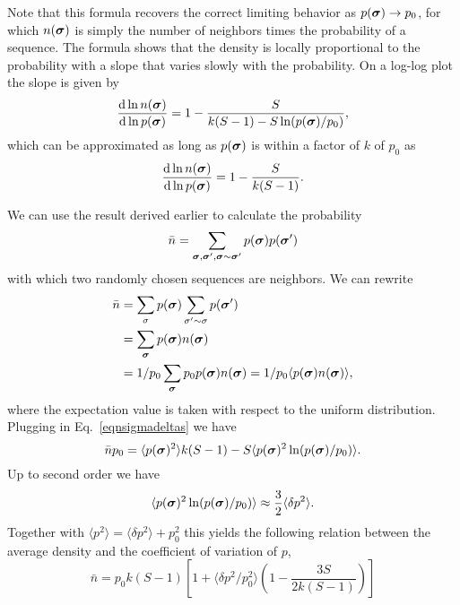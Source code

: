 Note that this formula recovers the correct limiting behavior as $p(\boldsymbol \sigma) \to p_0$, for which $n(\boldsymbol \sigma)$ is simply the number of neighbors times the probability of a sequence. The formula shows that the density is locally proportional to the probability with a slope that varies slowly with the probability. On a log-log plot the slope is given by
\begin{equation}
\frac{\mathrm{d} \ln n(\boldsymbol \sigma)}{\mathrm{d} \ln p(\boldsymbol \sigma)} = 1 - \frac{S}{k(S-1) - S \ln(p(\boldsymbol \sigma)/p_0)},
\end{equation}
which can be approximated as long as $p(\boldsymbol \sigma)$ is within a factor of $k$ of $p_0$ as
\begin{equation}
\frac{\mathrm{d} \ln n(\boldsymbol \sigma)}{\mathrm{d} \ln p(\boldsymbol \sigma)} = 1 - \frac{S}{k(S-1)}.
\end{equation}

We can use the result derived earlier to calculate the probability 
\begin{align}
\bar n = \sum_{\boldsymbol \sigma, \boldsymbol \sigma', \boldsymbol \sigma \sim \boldsymbol \sigma'} p(\boldsymbol \sigma) p(\boldsymbol \sigma') 
\end{align}
with which two randomly chosen sequences are neighbors. We can rewrite
\begin{align*}
\bar n &= \sum_{\sigma} p(\boldsymbol \sigma) \sum_{\sigma' \sim \sigma} p(\boldsymbol \sigma')  \\
    &= \sum_{\boldsymbol \sigma} p(\boldsymbol \sigma) n(\boldsymbol \sigma)\\
    &= 1/p_0 \sum_{\boldsymbol \sigma} p_0 p(\boldsymbol \sigma) n(\boldsymbol \sigma) = 1/p_0 \langle p(\boldsymbol \sigma) n(\boldsymbol \sigma) \rangle,
\end{align*}
where the expectation value is taken with respect to the uniform distribution.
Plugging in Eq.~\ref{eqnsigmadeltas} we have
\begin{equation}
\bar n p_0 = \langle p(\boldsymbol \sigma)^2 \rangle k(S-1) - S \langle p(\boldsymbol \sigma)^2 \ln (p(\boldsymbol \sigma)/p_0) \rangle.
\end{equation}
Up to second order we have
\begin{equation}
\langle p(\boldsymbol \sigma)^2 \ln (p(\boldsymbol \sigma)/p_0) \rangle \approx \frac{3}{2} \langle \delta p^2\rangle.
\end{equation}
Together with $\langle p^2 \rangle = \langle \delta p^2\rangle + p_0^2$ this yields the following relation between the average density and the coefficient of variation of $p$,
\begin{equation}
\bar n = p_0 k (S-1) \left[1+\langle \delta p^2/p_0^2 \rangle \left(1 - \frac{3S}{2k(S-1)}\right) \right]
\end{equation}


